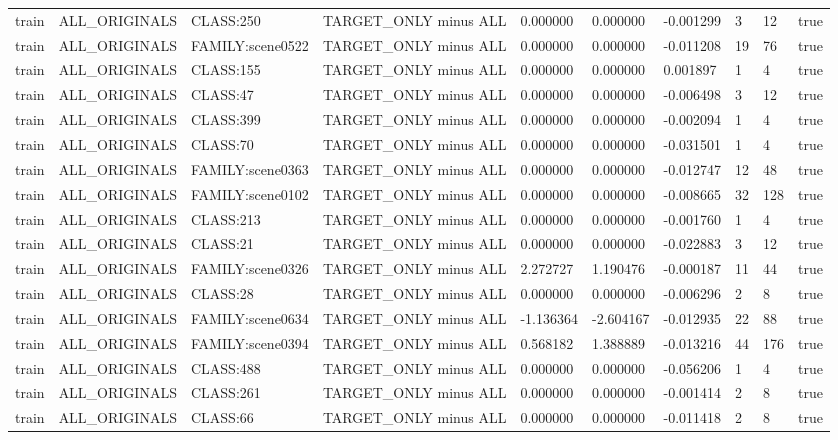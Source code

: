 \begin{tabular}{llllllllll}
train & ALL\_ORIGINALS & CLASS:250 & TARGET\_ONLY minus ALL & 0.000000 & 0.000000 & -0.001299 & 3 & 12 & true \\
train & ALL\_ORIGINALS & FAMILY:scene0522 & TARGET\_ONLY minus ALL & 0.000000 & 0.000000 & -0.011208 & 19 & 76 & true \\
train & ALL\_ORIGINALS & CLASS:155 & TARGET\_ONLY minus ALL & 0.000000 & 0.000000 & 0.001897 & 1 & 4 & true \\
train & ALL\_ORIGINALS & CLASS:47 & TARGET\_ONLY minus ALL & 0.000000 & 0.000000 & -0.006498 & 3 & 12 & true \\
train & ALL\_ORIGINALS & CLASS:399 & TARGET\_ONLY minus ALL & 0.000000 & 0.000000 & -0.002094 & 1 & 4 & true \\
train & ALL\_ORIGINALS & CLASS:70 & TARGET\_ONLY minus ALL & 0.000000 & 0.000000 & -0.031501 & 1 & 4 & true \\
train & ALL\_ORIGINALS & FAMILY:scene0363 & TARGET\_ONLY minus ALL & 0.000000 & 0.000000 & -0.012747 & 12 & 48 & true \\
train & ALL\_ORIGINALS & FAMILY:scene0102 & TARGET\_ONLY minus ALL & 0.000000 & 0.000000 & -0.008665 & 32 & 128 & true \\
train & ALL\_ORIGINALS & CLASS:213 & TARGET\_ONLY minus ALL & 0.000000 & 0.000000 & -0.001760 & 1 & 4 & true \\
train & ALL\_ORIGINALS & CLASS:21 & TARGET\_ONLY minus ALL & 0.000000 & 0.000000 & -0.022883 & 3 & 12 & true \\
train & ALL\_ORIGINALS & FAMILY:scene0326 & TARGET\_ONLY minus ALL & 2.272727 & 1.190476 & -0.000187 & 11 & 44 & true \\
train & ALL\_ORIGINALS & CLASS:28 & TARGET\_ONLY minus ALL & 0.000000 & 0.000000 & -0.006296 & 2 & 8 & true \\
train & ALL\_ORIGINALS & FAMILY:scene0634 & TARGET\_ONLY minus ALL & -1.136364 & -2.604167 & -0.012935 & 22 & 88 & true \\
train & ALL\_ORIGINALS & FAMILY:scene0394 & TARGET\_ONLY minus ALL & 0.568182 & 1.388889 & -0.013216 & 44 & 176 & true \\
train & ALL\_ORIGINALS & CLASS:488 & TARGET\_ONLY minus ALL & 0.000000 & 0.000000 & -0.056206 & 1 & 4 & true \\
train & ALL\_ORIGINALS & CLASS:261 & TARGET\_ONLY minus ALL & 0.000000 & 0.000000 & -0.001414 & 2 & 8 & true \\
train & ALL\_ORIGINALS & CLASS:66 & TARGET\_ONLY minus ALL & 0.000000 & 0.000000 & -0.011418 & 2 & 8 & true \\

\end{tabular}
